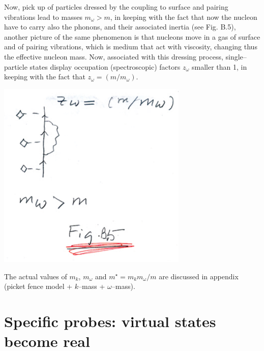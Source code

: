 \documentclass[a4paper,onecolumn,superscriptaddress,12pt,nofootinbib,twoside,raggedfooter,notitlepage]{revtex4-1}
\begin{document}
Now, pick up of particles dressed by the coupling to surface and pairing vibrations lead to masses $m_\omega > m$, in keeping with the fact that now the nucleon have to carry also the phonons, and their associated inertia (see Fig. B.5), another picture of the same phenomenon is that nucleons move in a gas of surface and of pairing vibrations, which is medium that act with viscosity, changing thus the effective nucleon mass. Now, associated with this dressing process, single--particle states display occupation (spectroscopic) factors $z_\omega$ smaller than 1, in keeping with the fact that $z_\omega = (m/m_\omega)$.
\begin{center}
	\includegraphics[width=0.68\textwidth]{figs/fig_b5}
\end{center}

The actual values of $m_k$, $m_\omega$ and $m^\star = m_k m_\omega/m$ are discussed in appendix \quad (picket fence model + $k$--mass + $\omega$--mass).



\pagebreak

\section{Specific probes: virtual states become real}
\end{document}
